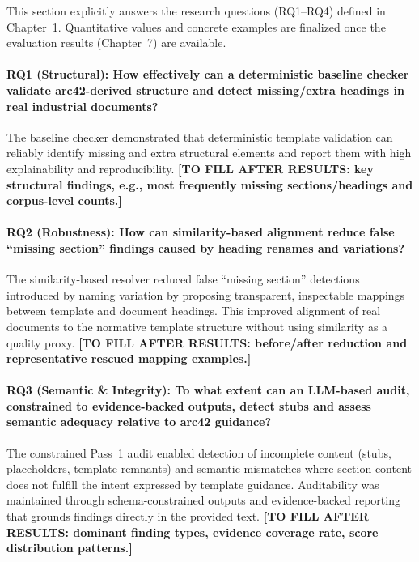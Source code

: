 This section explicitly answers the research questions (RQ1--RQ4) defined in Chapter~1. Quantitative values and concrete examples are finalized once the evaluation results (Chapter~7) are available.

\paragraph{RQ1 (Structural): How effectively can a deterministic baseline checker validate arc42-derived structure and detect missing/extra headings in real industrial documents?}
The baseline checker demonstrated that deterministic template validation can reliably identify missing and extra structural elements and report them with high explainability and reproducibility. \textbf{[TO FILL AFTER RESULTS: key structural findings, e.g., most frequently missing sections/headings and corpus-level counts.]}

\paragraph{RQ2 (Robustness): How can similarity-based alignment reduce false ``missing section'' findings caused by heading renames and variations?}
The similarity-based resolver reduced false ``missing section'' detections introduced by naming variation by proposing transparent, inspectable mappings between template and document headings. This improved alignment of real documents to the normative template structure without using similarity as a quality proxy. \textbf{[TO FILL AFTER RESULTS: before/after reduction and representative rescued mapping examples.]}

\paragraph{RQ3 (Semantic \& Integrity): To what extent can an LLM-based audit, constrained to evidence-backed outputs, detect stubs and assess semantic adequacy relative to arc42 guidance?}
The constrained Pass~1 audit enabled detection of incomplete content (stubs, placeholders, template remnants) and semantic mismatches where section content does not fulfill the intent expressed by template guidance. Auditability was maintained through schema-constrained outputs and evidence-backed reporting that grounds findings directly in the provided text. \textbf{[TO FILL AFTER RESULTS: dominant finding types, evidence coverage rate, score distribution patterns.]}

